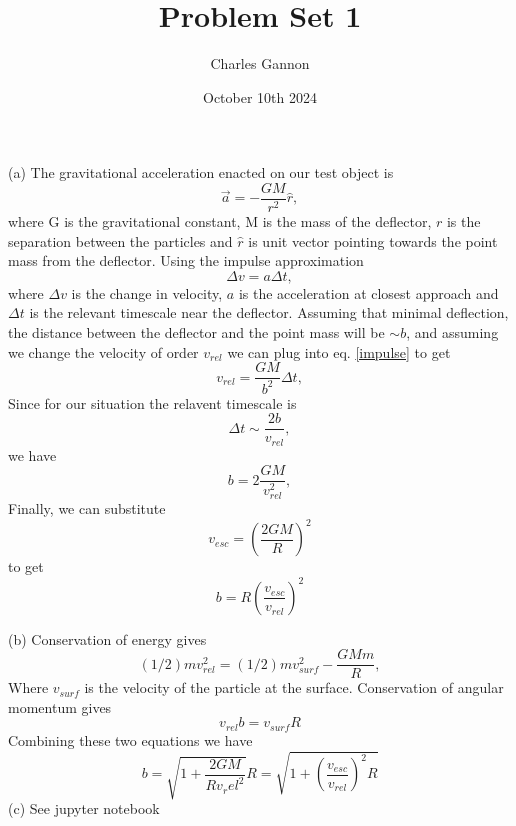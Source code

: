 \documentclass{article}
\title{Problem Set 1}
\date{October 10th 2024}
\author{Charles Gannon}
\begin{document}
  \maketitle
  (a) The gravitational acceleration enacted on our test object is
  \begin{equation}
      \vec{a} = -\frac{G M}{r^2}\hat{r}, 
  \end{equation}
  where G is the gravitational constant, M is the mass of the deflector, $r$ is the separation between the particles and $\hat{r}$ is unit vector pointing towards the point mass from the deflector.
  Using the impulse approximation 
  \begin{equation}\label{impulse}
    \Delta v = a \Delta t, 
  \end{equation}
  where $\Delta v$ is the change in velocity, $a$ is the acceleration at closest approach and $\Delta t$ is the relevant timescale near the deflector.
  Assuming that minimal deflection, the distance between the deflector and the point mass will be $\sim b$, and assuming we change the velocity of order $v_{rel} $  we can plug into eq. \ref{impulse} to get 
  \begin{equation}
      v_{rel} = \frac{G M}{b^2} \Delta t ,
  \end{equation}
  Since for our situation the relavent timescale is 
  \begin{equation}
      \Delta t \sim \frac{2b}{v_{rel}},
  \end{equation}
  we have 
  \begin{equation}
      b = 2 \frac{G M}{v_{rel}^2},
  \end{equation}
  Finally, we can substitute 
  \begin{equation}
      v_{esc} = \left( \frac{2 G M}{R} \right) ^ 2
  \end{equation}
  to get 
  \begin{equation}
      b = R \left( \frac{v_{esc}}{v_{rel}} \right)^2
  \end{equation} 

  (b) Conservation of energy gives 
  \begin{equation}
      (1/2) m v_{rel}^2 = (1/2) m v_{surf}^2 - \frac{G M m}{R},
  \end{equation}
  Where $v_{surf}$ is the velocity of the particle at the surface.
  Conservation of angular momentum gives 
  \begin{equation}
    v_{rel} b = v_{surf} R
  \end{equation}
  Combining these two equations we have 
  \begin{equation}
      b = \sqrt{1 + \frac{2 G M}{R v_rel^2}}R = \sqrt{1 + \left( \frac{v_{esc}}{ v_{rel}} \right)^2 R}
  \end{equation}
  (c) See jupyter notebook
  
\end{document}
